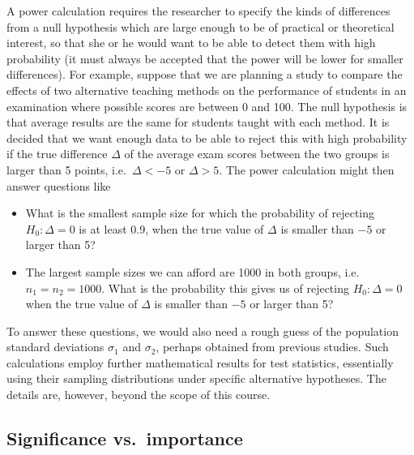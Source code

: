 \documentclass[11pt,a4paper,openany]{book}
\begin{document}
A power calculation requires the researcher to specify the kinds of
differences from a null hypothesis which are large enough to be of
practical or theoretical interest, so that she or he would want to be
able to detect them with high probability (it must always be accepted
that the power will be lower for smaller differences). For example,
suppose that we are planning a study to compare the effects of two
alternative teaching methods on the performance of students in an
examination where possible scores are between 0 and 100. The null
hypothesis is that average results are the same for students taught with
each method. It is decided that we want enough data to be able to reject
this with high probability if the true difference \(\Delta\) of the
average exam scores between the two groups is larger than 5 points,
i.e.~\(\Delta<-5\) or \(\Delta>5\). The power calculation might then
answer questions like

\begin{itemize}
\item
  What is the smallest sample size for which the probability of
  rejecting \(H_{0}: \Delta=0\) is at least 0.9, when the true value of
  \(\Delta\) is smaller than \(-5\) or larger than 5?
\item
  The largest sample sizes we can afford are 1000 in both groups, i.e.
  \(n_{1}=n_{2}=1000\). What is the probability this gives us of
  rejecting \(H_{0}: \Delta=0\) when the true value of \(\Delta\) is
  smaller than \(-5\) or larger than 5?
\end{itemize}

To answer these questions, we would also need a rough guess of the
population standard deviations \(\sigma_{1}\) and \(\sigma_{2}\),
perhaps obtained from previous studies. Such calculations employ further
mathematical results for test statistics, essentially using their
sampling distributions under specific alternative hypotheses. The
details are, however, beyond the scope of this course.

\subsection{Significance
vs.~importance}\label{ss-means-tests3-importance}
\end{document}
